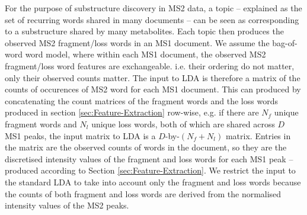 For the purpose of substructure discovery in MS2 data, a topic -- explained as the set of recurring words shared in many documents -- can be seen as corresponding to a substructure shared by many metabolites. Each topic then produces the observed MS2 fragment/loss words in an MS1 document. We assume the bag-of-word word model, where within each MS1 document, the observed MS2 fragment/loss word features are exchangeable. i.e. their ordering do not matter, only their observed counts matter. The input to LDA is therefore a matrix of the counts of occurences of MS2 word for each MS1 document. This can produced by concatenating the count matrices of the fragment words and the loss words produced in section \ref{sec:Feature-Extraction} row-wise, e.g. if there are $N_{f}$ unique fragment words and $N_{l}$ unique loss words, both of which are shared across $D$ MS1 peaks, the input matrix to LDA is a $D$-by-$(N_{f}+N_{l})$ matrix. Entries in the matrix are the observed counts of words in the document, so they are the discretised intensity values of the fragment and loss words for each MS1 peak -- produced according to Section \ref{sec:Feature-Extraction}. We restrict the input to the standard LDA to take into account only the fragment and loss words because the counts of both fragment and loss words are derived from the normalised intensity values of the MS2 peaks.


